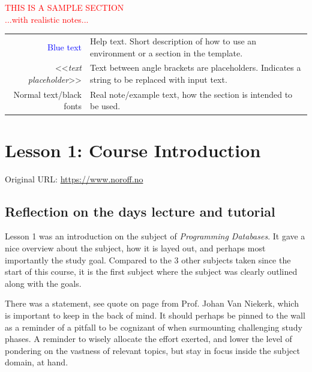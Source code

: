 
{\begin{center}
    \textcolor{red}{\Huge{THIS IS A SAMPLE SECTION}\\ ...with realistic notes...}

    \begin{tabular}{r @{: } p{80mm}}
        {\textcolor{blue}{Blue text}} &  Help text. Short description of how to use an environment or a section in the template.\\
        <<{\emph{text placeholder}}>> & Text between angle brackets are placeholders. Indicates a string to be replaced with input text.\\
        Normal text/black fonts & Real note/example text, how the section is intended to be used.
    \end{tabular}

\end{center}

\section{Lesson 1: Course Introduction}

Original URL: \url{https://www.noroff.no}


\subsection{Reflection on the days lecture and tutorial}

Lesson 1 was an introduction on the subject of {\emph{Programming Databases}}. It gave a nice overview about the subject, how it is layed out, and perhaps most importantly the study goal. Compared to the 3 other subjects taken since the start of this course, it is the first subject where the subject was clearly outlined along with the goals.

There was a statement, see quote on page \pageref{quote} from Prof. Johan Van Niekerk, which is important to keep in the back of mind. It should perhaps be pinned to the wall as a reminder of a pitfall to be cognizant of when surmounting challenging study phases. A reminder to wisely allocate the effort exerted, and lower the level of pondering on the vastness of relevant topics, but stay in focus inside the subject domain, at hand.

}
